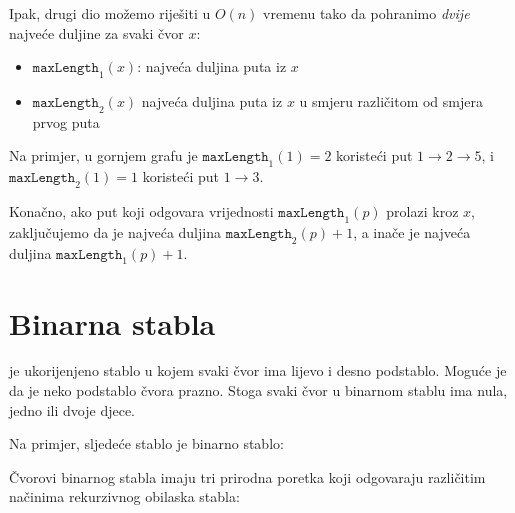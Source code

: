 Ipak, drugi dio možemo riješiti u
$O(n)$ vremenu tako da pohranimo \emph{dvije} najveće duljine
za svaki čvor $x$:
\begin{itemize}
\item $\texttt{maxLength}_1(x)$:
najveća duljina puta iz $x$
\item $\texttt{maxLength}_2(x)$
najveća duljina puta iz $x$
u smjeru različitom od smjera prvog puta
\end{itemize}
Na primjer, u gornjem grafu je
$\texttt{maxLength}_1(1)=2$
koristeći put $1 \rightarrow 2 \rightarrow 5$,
i $\texttt{maxLength}_2(1)=1$
koristeći put $1 \rightarrow 3$.

Konačno, ako put koji odgovara
vrijednosti $\texttt{maxLength}_1(p)$ prolazi kroz $x$,
zaključujemo da je najveća duljina
$\texttt{maxLength}_2(p)+1$,
a inače je najveća duljina
$\texttt{maxLength}_1(p)+1$.


\section{Binarna stabla}


\begin{samepage}
 je ukorijenjeno stablo
u kojem svaki čvor ima lijevo i desno podstablo.
Moguće je da je neko podstablo čvora prazno.
Stoga svaki čvor u binarnom stablu ima
nula, jedno ili dvoje djece.

Na primjer, sljedeće stablo je binarno stablo:
\begin{center}
\end{center}
\end{samepage}


Čvorovi binarnog stabla imaju tri prirodna
poretka koji odgovaraju različitim načinima 
rekurzivnog obilaska stabla:

